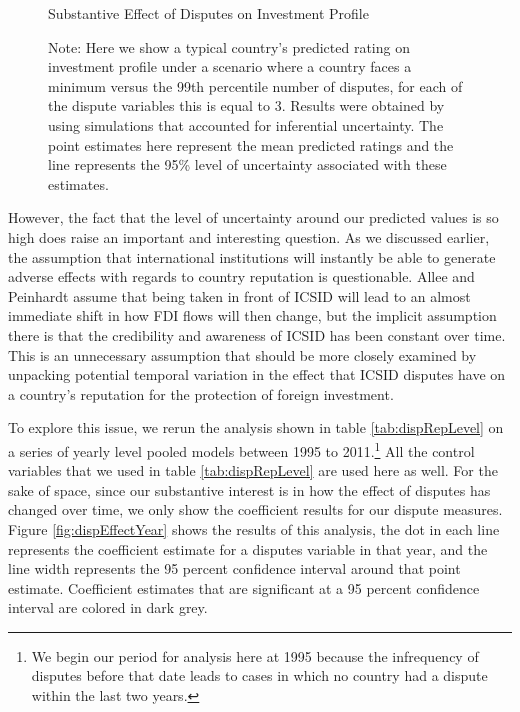 \documentclass[12pt,onesided]{amsart}
\begin{document}

\begin{figure}[ht]
	\vspace{4cm}
	\centering
	\caption{Substantive Effect of Disputes on Investment Profile}
	\label{fig:subEffect}
	\resizebox{1\textwidth}{!}{}
	\caption*{Note: Here we show a typical country's predicted rating on investment profile under a scenario where a country faces a minimum versus the 99th percentile number of disputes, for each of the dispute variables this is equal to 3. Results were obtained by using simulations that accounted for inferential uncertainty. The point estimates here represent the mean predicted ratings and the line represents the 95\% level of uncertainty associated with these estimates.}
\end{figure}


However, the fact that the level of uncertainty around our predicted values is so high does raise an important and interesting question. As we discussed earlier, the assumption that international institutions will instantly be able to generate adverse effects with regards to country reputation is questionable. Allee and Peinhardt assume that being taken in front of ICSID will lead to an almost immediate shift in how FDI flows will then change, but the implicit assumption there is that the credibility and awareness of ICSID has been constant over time. This is an unnecessary assumption that should be more closely examined by unpacking potential temporal variation in the effect that ICSID disputes have on a country's reputation for the protection of foreign investment.

To explore this issue, we rerun the analysis shown in table \ref{tab:dispRepLevel} on a series of yearly level pooled models between 1995 to 2011.\footnote{We begin our period for analysis here at 1995 because the infrequency of disputes before that date leads to cases in which no country had a dispute within the last two years.} All the control variables that we used in table \ref{tab:dispRepLevel} are used here as well. For the sake of space, since our substantive interest is in how the effect of disputes has changed over time, we only show the coefficient results for our dispute measures. Figure \ref{fig:dispEffectYear} shows the results of this analysis, the dot in each line represents the coefficient estimate for a disputes variable in that year, and the line width represents the 95 percent confidence interval around that point estimate. Coefficient estimates that are significant at a 95 percent confidence interval are colored in dark grey. 
\end{document}
